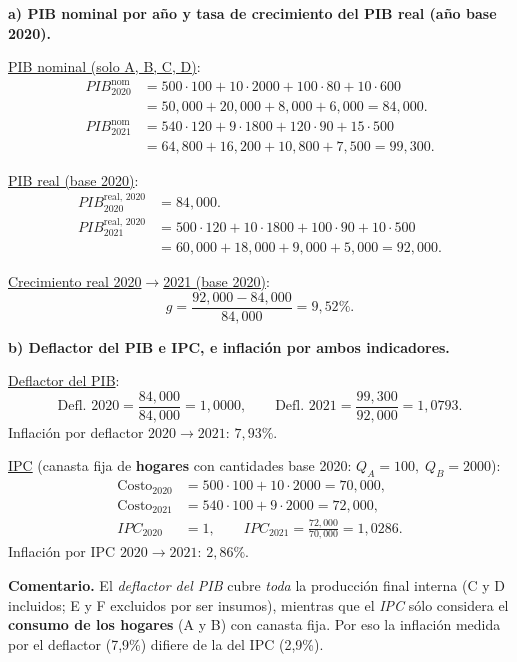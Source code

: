 \documentclass[11pt,addpoints]{article}
\begin{document}
\textbf{a) PIB nominal por año y tasa de crecimiento del PIB real (año base 2020).}

\underline{PIB nominal (solo A, B, C, D)}:
\[
\begin{aligned}
PIB_{2020}^{\text{nom}} &= 500\cdot100 + 10\cdot2000 + 100\cdot80 + 10\cdot600 \\
&= 50{,}000 + 20{,}000 + 8{,}000 + 6{,}000 = \boxed{84{,}000}.\\[4pt]
PIB_{2021}^{\text{nom}} &= 540\cdot120 + 9\cdot1800 + 120\cdot90 + 15\cdot500 \\
&= 64{,}800 + 16{,}200 + 10{,}800 + 7{,}500 = \boxed{99{,}300}.
\end{aligned}
\]

\underline{PIB real (base 2020)}:
\[
\begin{aligned}
PIB_{2020}^{\text{real},\,2020} &= \boxed{84{,}000}.\\[2pt]
PIB_{2021}^{\text{real},\,2020} &= 500\cdot120 + 10\cdot1800 + 100\cdot90 + 10\cdot500 \\
&= 60{,}000 + 18{,}000 + 9{,}000 + 5{,}000 = \boxed{92{,}000}.
\end{aligned}
\]

\underline{Crecimiento real 2020$\to$2021 (base 2020)}:
\[
g=\frac{92{,}000 - 84{,}000}{84{,}000} = \boxed{9{,}52\%}.
\]

\vspace{0.3cm}

\textbf{b) Deflactor del PIB e IPC, e inflación por ambos indicadores.}

\underline{Deflactor del PIB}:
\[
\text{Defl. }2020=\frac{84{,}000}{84{,}000}= \boxed{1{,}0000},\qquad
\text{Defl. }2021=\frac{99{,}300}{92{,}000}= \boxed{1{,}0793}.
\]
Inflación por deflactor \(2020\to2021\): \(\boxed{7{,}93\%}\).

\newpage
\vspace*{0.1cm}
\underline{IPC} (canasta fija de \textbf{hogares} con cantidades base 2020: \(Q_A=100,\;Q_B=2000\)):
\[
\begin{aligned}
\text{Costo}_{2020} &= 500\cdot100 + 10\cdot2000 = 70{,}000,\\
\text{Costo}_{2021} &= 540\cdot100 + 9\cdot2000   = 72{,}000,\\
IPC_{2020} &= 1,\qquad IPC_{2021}=\frac{72{,}000}{70{,}000}=\boxed{1{,}0286}.
\end{aligned}
\]
Inflación por IPC \(2020\to2021\): \(\boxed{2{,}86\%}\).

\textbf{Comentario.} El \emph{deflactor del PIB} cubre \emph{toda} la producción final interna (C y D incluidos; E y F excluidos por ser insumos), mientras que el \emph{IPC} sólo considera el \textbf{consumo de los hogares} (A y B) con canasta fija. Por eso la inflación medida por el deflactor (7,9\%) difiere de la del IPC (2,9\%).
\end{document}
